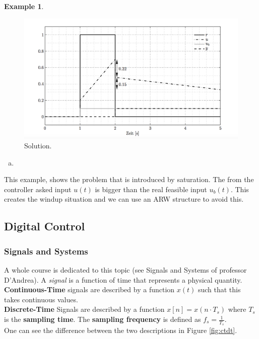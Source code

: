 \documentclass[a4paper,12 pt]{article}
\numberwithin{equation}{section}
\theoremstyle{definition}
\newtheorem{bsp}{Example}
\theoremstyle{remark}
\theoremstyle{definition}
\theoremstyle{definition}
\theoremstyle{definition}
\theoremstyle{remark}
\begin{document}
\begin{bsp}
\begin{figure}[H]
\begin{center}
\includegraphics[width=0.9\columnwidth]{sol}
\end{center}
\caption{Solution.}
\label{fig:sol}
\end{figure}

\begin{enumerate}[(b)]
\item
\end{enumerate}
This example, shows the problem that is introduced by saturation. The from the controller asked input $u(t)$ is bigger than the real feasible input $u_b(t)$. This creates the windup situation and we can use an ARW structure to avoid this. 

\end{bsp}
\newpage
\subsection{Digital Control}
\subsubsection{Signals and Systems}
A whole course is dedicated to this topic (see Signals and Systems of professor D'Andrea). A \textit{signal} is a function of time that represents a physical quantity. \\ \textbf{Continuous-Time} signals are described by a function $x(t)$ such that this takes continuous values. \\\textbf{Discrete-Time} Signals are described by a function $x[n]=x(n\cdot T_s)$ where $T_s$ is the \textbf{sampling time}. The \textbf{sampling frequency} is defined as $f_s=\frac{1}{T_s}$. \\
One can see the difference between the two descriptions in Figure \ref{fig:ctdt}.
\end{document}
